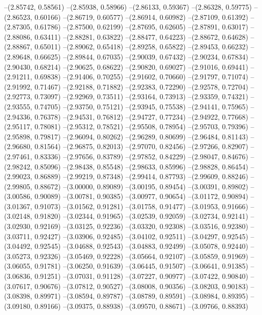 --(2.85742, 0.58561)
--(2.85938, 0.58966)
--(2.86133, 0.59367)
--(2.86328, 0.59775)
--(2.86523, 0.60166)
--(2.86719, 0.60577)
--(2.86914, 0.60982)
--(2.87109, 0.61392)
--(2.87305, 0.61786)
--(2.87500, 0.62199)
--(2.87695, 0.62605)
--(2.87891, 0.63017)
--(2.88086, 0.63411)
--(2.88281, 0.63822)
--(2.88477, 0.64223)
--(2.88672, 0.64628)
--(2.88867, 0.65011)
--(2.89062, 0.65418)
--(2.89258, 0.65822)
--(2.89453, 0.66232)
--(2.89648, 0.66625)
--(2.89844, 0.67035)
--(2.90039, 0.67432)
--(2.90234, 0.67834)
--(2.90430, 0.68214)
--(2.90625, 0.68622)
--(2.90820, 0.69027)
--(2.91016, 0.69441)
--(2.91211, 0.69838)
--(2.91406, 0.70255)
--(2.91602, 0.70660)
--(2.91797, 0.71074)
--(2.91992, 0.71467)
--(2.92188, 0.71882)
--(2.92383, 0.72290)
--(2.92578, 0.72704)
--(2.92773, 0.73097)
--(2.92969, 0.73511)
--(2.93164, 0.73913)
--(2.93359, 0.74321)
--(2.93555, 0.74705)
--(2.93750, 0.75121)
--(2.93945, 0.75538)
--(2.94141, 0.75965)
--(2.94336, 0.76378)
--(2.94531, 0.76812)
--(2.94727, 0.77234)
--(2.94922, 0.77668)
--(2.95117, 0.78081)
--(2.95312, 0.78521)
--(2.95508, 0.78954)
--(2.95703, 0.79396)
--(2.95898, 0.79817)
--(2.96094, 0.80262)
--(2.96289, 0.80699)
--(2.96484, 0.81143)
--(2.96680, 0.81564)
--(2.96875, 0.82013)
--(2.97070, 0.82456)
--(2.97266, 0.82907)
--(2.97461, 0.83336)
--(2.97656, 0.83789)
--(2.97852, 0.84229)
--(2.98047, 0.84676)
--(2.98242, 0.85096)
--(2.98438, 0.85548)
--(2.98633, 0.85996)
--(2.98828, 0.86454)
--(2.99023, 0.86889)
--(2.99219, 0.87348)
--(2.99414, 0.87793)
--(2.99609, 0.88246)
--(2.99805, 0.88672)
--(3.00000, 0.89089)
--(3.00195, 0.89454)
--(3.00391, 0.89802)
--(3.00586, 0.90089)
--(3.00781, 0.90385)
--(3.00977, 0.90654)
--(3.01172, 0.90894)
--(3.01367, 0.91073)
--(3.01562, 0.91281)
--(3.01758, 0.91477)
--(3.01953, 0.91666)
--(3.02148, 0.91820)
--(3.02344, 0.91965)
--(3.02539, 0.92059)
--(3.02734, 0.92141)
--(3.02930, 0.92169)
--(3.03125, 0.92236)
--(3.03320, 0.92308)
--(3.03516, 0.92380)
--(3.03711, 0.92427)
--(3.03906, 0.92485)
--(3.04102, 0.92511)
--(3.04297, 0.92545)
--(3.04492, 0.92545)
--(3.04688, 0.92543)
--(3.04883, 0.92499)
--(3.05078, 0.92440)
--(3.05273, 0.92326)
--(3.05469, 0.92228)
--(3.05664, 0.92107)
--(3.05859, 0.91969)
--(3.06055, 0.91781)
--(3.06250, 0.91639)
--(3.06445, 0.91507)
--(3.06641, 0.91385)
--(3.06836, 0.91251)
--(3.07031, 0.91128)
--(3.07227, 0.90977)
--(3.07422, 0.90840)
--(3.07617, 0.90676)
--(3.07812, 0.90527)
--(3.08008, 0.90356)
--(3.08203, 0.90183)
--(3.08398, 0.89971)
--(3.08594, 0.89787)
--(3.08789, 0.89591)
--(3.08984, 0.89395)
--(3.09180, 0.89166)
--(3.09375, 0.88938)
--(3.09570, 0.88671)
--(3.09766, 0.88393)
